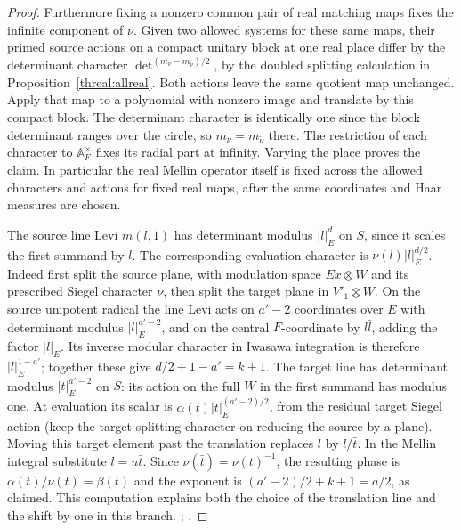 \begin{proof}
Furthermore fixing a nonzero common pair of real matching maps fixes
the infinite component of \(\nu\). Given two allowed systems for
these same maps, their primed source actions on a compact unitary
block at one real place differ by the determinant character
\(\det^{(m_\nu-m_{\widetilde\nu})/2}\), by the doubled splitting
calculation in Proposition~\ref{threal:allreal}. Both actions leave
the same quotient map unchanged. Apply that map to a polynomial
with nonzero image and translate by this compact block. The
determinant character is identically one since the block determinant
ranges over the circle, so \(m_\nu=m_{\widetilde\nu}\) there.
The restriction of each character to \(\mathbb A_F^\times\) fixes
its radial part at infinity. Varying the place proves the claim.
In particular the real Mellin operator itself is fixed across
the allowed characters and actions for fixed real maps, after the
same coordinates and Haar measures are chosen.

The source line Levi \(m(l,1)\) has determinant modulus
\(|l|_E^d\) on \(S\), since it scales the first summand by \(l\).
The corresponding evaluation character is \(\nu(l)|l|_E^{d/2}\).
Indeed first split the source plane, with modulation space
\(Ex\otimes W\) and its prescribed Siegel character \(\nu\),
then split the target plane in \(V'_1\otimes W\). On the source
unipotent radical the line Levi acts on \(a'-2\) coordinates over
\(E\) with determinant modulus \(|l|_E^{a'-2}\), and on the central
\(F\)-coordinate by \(l\bar l\), adding the factor \(|l|_E\).
Its inverse modular character in Iwasawa integration is therefore
\(|l|_E^{1-a'}\); together these give \(d/2+1-a'=k+1\).
The target line has determinant modulus \(|t|_E^{a'-2}\) on \(S\):
its action on the full \(W\) in the first summand has modulus one.
At evaluation its scalar is \(\alpha(t)|t|_E^{(a'-2)/2}\), from
the residual target Siegel action (keep the target splitting
character on reducing the source by a plane). Moving this target
element past the translation replaces \(l\) by \(l/\bar t\).
In the Mellin integral substitute \(l=u\bar t\). Since
\(\nu(\bar t)=\nu(t)^{-1}\), the resulting phase is
\(\alpha(t)/\nu(t)=\beta(t)\) and the exponent is
\((a'-2)/2+k+1=a/2\), as claimed. This computation explains both
the choice of the translation line and the shift by one in this
branch.
;
.
\end{proof}

